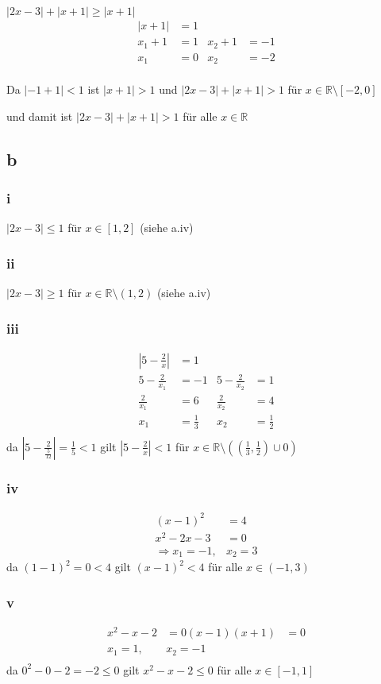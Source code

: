 \documentclass{article}
\begin{document}
$|2x-3|+|x+1|\geq |x+1|$
\begin{align*}
    |x+1|&=1\\
    x_1+1&=1&
    x_2+1&=-1\\
    x_1&=0&
    x_2&=-2\\
\end{align*}

Da $|-1+1|<1$ ist $|x+1|>1$ und $|2x-3|+|x+1|>1$ für 
$x\in \mathbb R\setminus [-2, 0]$

und damit ist $|2x-3|+|x+1|>1$ für alle $x\in\mathbb R$
\subsection*{b}
\subsubsection*{i}
$|2x-3|\leq 1$ für $x\in [1,2]$ (siehe a.iv)
\subsubsection*{ii}
$|2x-3|\geq 1$ für $x\in\mathbb R\setminus (1,2)$ (siehe a.iv)
\subsubsection*{iii}
\begin{align*}
    |5-\frac{2}{x}|&=1\\
    5-\frac{2}{x_1}&=-1&
    5-\frac{2}{x_2}&=1\\
    \frac{2}{x_1}&=6&
    \frac{2}{x_2}&=4\\
    {x_1}&=\frac{1}{3}&
    x_2&=\frac{1}{2}\\
\end{align*}
da $|5-\frac{2}{\frac{5}{12}}| = \frac{1}{5}<1$ gilt
$|5-\frac{2}{x}|<1$ für $x\in \mathbb R\setminus ((\frac{1}{3},\frac{1}{2})\cup 0)$

\subsubsection*{iv}
\begin{align*}
    (x-1)^2&=4\\
    x^2-2x-3&=0\\
    \Rightarrow x_1=-1,&x_2=3
\end{align*}
da $(1-1)^2=0<4$ gilt $(x-1)^2<4$ für alle $x\in(-1, 3)$
\subsubsection*{v}
\begin{align*}
    x^2-x-2&=0
    (x-1)(x+1)&=0\\
    x_1=1,&x_2=-1\\
\end{align*}
da $0^2-0-2=-2\leq 0$ gilt $x^2-x-2\leq 0$ für alle $x\in[-1, 1]$
\end{document}
